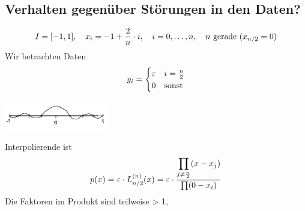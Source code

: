 \subsection*{Verhalten gegenüber Störungen in den Daten?}
\begin{example}
    \[I=[-1,1], \hspace{1em} x_i=-1+\frac{2}{n}\cdot i, \hspace{1em} i=0,\dots,n,\hspace{1em} n\text{ gerade }(x_{n/2} = 0)\]
    Wir betrachten Daten\[
    y_i = \begin{cases}
        \varepsilon & i=\frac{n}{2}\\
        0 & \text{sonst}
    \end{cases}
    \] \begin{center}
        \includegraphics[width=45mm]{../Bilder/x_2_1.png}\\
    \end{center}
    Interpolierende ist \[
    p(x) = \varepsilon\cdot L_{n/2}^{(n)}(x) = \varepsilon\cdot \displaystyle\frac{\displaystyle\prod_{j\neq \frac{n}{2}}(x-x_j)}{\prod(0-x_i)}
    \]
    Die Faktoren im Produkt sind teilweise > 1,
\end{example}

